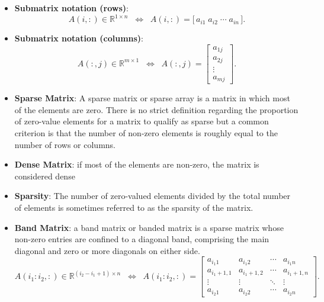 \documentclass{report}
\begin{document}
\begin{itemize}
        \item \textbf{Submatrix notation (rows)}: 
            \[
                A(i,:) \in \mathbb{R}^{1 \times n} \;\;\Longleftrightarrow\;\;
                A(i,:) = \bigl[\, a_{i1} \; a_{i2} \; \cdots \; a_{in} \,\bigr].
            \]
        \item \textbf{Submatrix notation (columns)}: 
            \[
                A(:,j) \in \mathbb{R}^{m \times 1} \;\;\Longleftrightarrow\;\;
                A(:,j) =
                \begin{bmatrix}
                    a_{1j} \\
                    a_{2j} \\
                    \vdots \\
                    a_{mj}
                \end{bmatrix}.
            \]
        \item \textbf{Sparse Matrix}: A sparse matrix or sparse array is a matrix in which most of the elements are zero. There is no strict definition regarding the proportion of zero-value elements for a matrix to qualify as sparse but a common criterion is that the number of non-zero elements is roughly equal to the number of rows or columns.
        \item \textbf{Dense Matrix}: if most of the elements are non-zero, the matrix is considered dense
        \item \textbf{Sparsity}: The number of zero-valued elements divided by the total number of elements is sometimes referred to as the sparsity of the matrix.
        \item \textbf{Band Matrix}: a band matrix or banded matrix is a sparse matrix whose non-zero entries are confined to a diagonal band, comprising the main diagonal and zero or more diagonals on either side.
            \bigbreak \noindent 
            \[
                A(i_{1}:i_{2},:) \in \mathbb{R}^{(i_{2}-i_{1}+1) \times n}
                \;\;\Longleftrightarrow\;\;
                A(i_{1}:i_{2},:) =
                \begin{bmatrix}
                    a_{i_{1}1} & a_{i_{1}2} & \cdots & a_{i_{1}n} \\
                    a_{i_{1}+1,1} & a_{i_{1}+1,2} & \cdots & a_{i_{1}+1,n} \\
                    \vdots & \vdots & \ddots & \vdots \\
                    a_{i_{2}1} & a_{i_{2}2} & \cdots & a_{i_{2}n}
                \end{bmatrix}.
            \]


\end{itemize}
\end{document}
